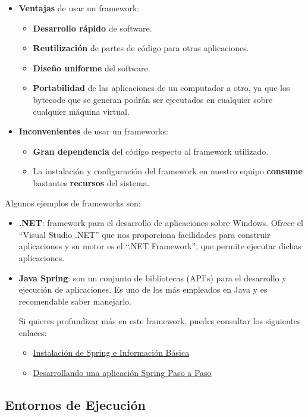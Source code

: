 \begin{itemize}
    \item \textbf{Ventajas} de usar un framework:
    \begin{itemize}
        \item \textbf{Desarrollo rápido} de software.
        \item \textbf{Reutilización} de partes de código para otras aplicaciones.
        \item \textbf{Diseño uniforme} del software.
        \item \textbf{Portabilidad} de las aplicaciones de un computador a otro, ya que los bytecode que se generan podrán ser ejecutados en cualquier sobre cualquier máquina virtual.
    \end{itemize}

    \item \textbf{Inconvenientes} de usar un frameworks:
    \begin{itemize}
        \item \textbf{Gran dependencia} del código respecto al framework utilizado.
        \item La instalación y configuración del framework en nuestro equipo \textbf{consume} bastantes \textbf{recursos} del sistema.
    \end{itemize}
\end{itemize}

Algunos ejemplos de frameworks son:

\begin{itemize}
    \item \textbf{.NET}: framework para el desarrollo de aplicaciones sobre Windows. Ofrece el ``Visual Studio .NET'' que nos proporciona facilidades para construir aplicaciones y su motor es el ``.NET Framework'', que permite ejecutar dichas aplicaciones.
    \item \textbf{Java Spring}: son un conjunto de bibliotecas (API's) para el desarrollo y ejecución de aplicaciones. Es uno de los más empleados en Java y es recomendable saber manejarlo.

    Si quieres profundizar más en este framework, puedes consultar los siguientes enlaces:
    \begin{itemize}
        \item \href{https://educacionadistancia.juntadeandalucia.es/formacionprofesional/pluginfile.php/35569/mod_scorm/content/16/spring_tutorial_v0.271.pdf}{Instalación de Spring e Información Básica}
        \item \href{https://www.uv.es/grimo/teaching/SpringMVCv4PasoAPaso/index.html}{Desarrollando una aplicación Spring Paso a Paso}
    \end{itemize}
\end{itemize}

\subsection{Entornos de Ejecución}






\glsaddall
\printglossaries


\newpage
{}



